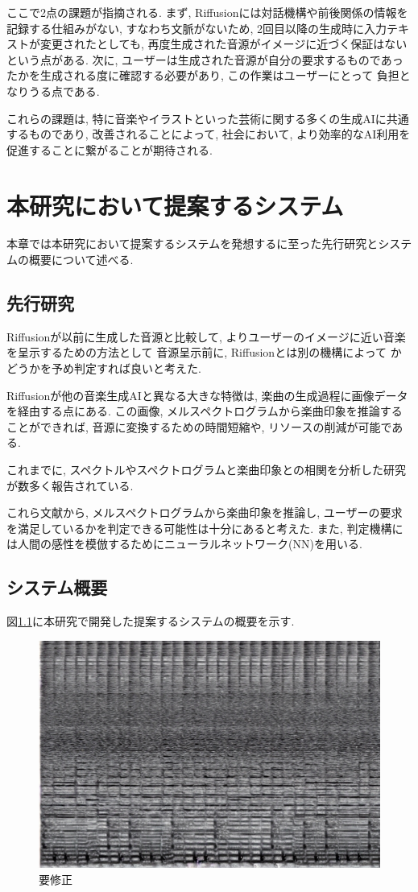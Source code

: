 \documentclass[a4paper,11pt,dvipdfmx]{jreport}
\begin{document}
ここで2点の課題が指摘される.
まず, Riffusionには対話機構や前後関係の情報を記録する仕組みがない, すなわち文脈がないため, 2回目以降の生成時に入力テキストが変更されたとしても,
再度生成された音源がイメージに近づく保証はないという点がある.
次に, ユーザーは生成された音源が自分の要求するものであったかを生成される度に確認する必要があり, この作業はユーザーにとって
負担となりうる点である.

これらの課題は, 特に音楽やイラストといった芸術に関する多くの生成AIに共通するものであり, 
改善されることによって, 社会において, より効率的なAI利用を促進することに繋がることが期待される.

\newpage
\chapter{本研究において提案するシステム}
本章では本研究において提案するシステムを発想するに至った先行研究とシステムの概要について述べる.
\section{先行研究}
Riffusionが以前に生成した音源と比較して, よりユーザーのイメージに近い音楽を呈示するための方法として
音源呈示前に, Riffusionとは別の機構によって
かどうかを予め判定すれば良いと考えた.

Riffusionが他の音楽生成AIと異なる大きな特徴は, 楽曲の生成過程に画像データを経由する点にある.
この画像, メルスペクトログラムから楽曲印象を推論することができれば, 
音源に変換するための時間短縮や, リソースの削減が可能である.

これまでに, スペクトルやスペクトログラムと楽曲印象との相関を分析した研究が数多く報告されている\cite{Nagoya,Tokyo, Matsue}.

これら文献から, メルスペクトログラムから楽曲印象を推論し, 
ユーザーの要求を満足しているかを判定できる可能性は十分にあると考えた.
また, 判定機構には人間の感性を模倣するためにニューラルネットワーク(NN)を用いる.

\section{システム概要}
図\ref{system}に本研究で開発した提案するシステムの概要を示す.

\begin{figure}[htbp]
  \centering
  \includegraphics[width=0.4\linewidth]{energy_guitar.jpg}
  \caption{要修正}
  \label{system}
\end{figure}
\end{document}
